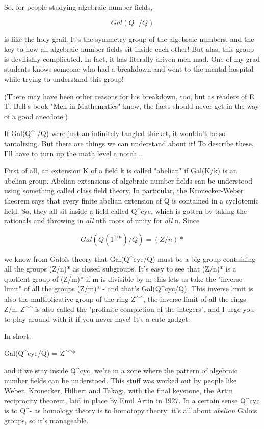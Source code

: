So, for people studying algebraic number fields,

$$
                           Gal(Q^{-}/Q)
$$
    
is like the holy grail.  It's the symmetry group of the algebraic numbers, 
and the key to how all algebraic number fields sit inside each other!
But alas, this group is devilishly complicated.  In fact, it has literally 
driven men mad.  One of my grad students knows someone who had a breakdown 
and went to the mental hospital while trying to understand this group!

(There may have been other reasons for his breakdown, too, but as readers
of E. T. Bell's book "Men in Mathematics" know, the facts should never get
in the way of a good anecdote.)  

If Gal(Q^{-}/Q) were just an infinitely tangled thicket, it wouldn't be so 
tantalizing.  But there are things we can understand about it!  To describe
these, I'll have to turn up the math level a notch...

First of all, an extension K of a field k is called "abelian" if Gal(K/k) 
is an abelian group.  Abelian extensions of algebraic number fields can be
understood using something called class field theory.  In particular, the 
Kronecker-Weber theorem says that every finite abelian extension of Q is 
contained in a cyclotomic field.  So, they all sit inside a field called
Q^{cyc}, which is gotten by taking the rationals and throwing in \emph{all} nth 
roots of unity for \emph{all} n.  Since

$$
Gal(Q(1^{1/n})/Q) = (Z/n)*
$$
    
we know from Galois theory that Gal(Q^{cyc}/Q) must be a big group containing 
all the groups (Z/n)* as closed subgroups.  It's easy to see that (Z/n)* is
a quotient group of (Z/m)* if m is divisible by n; this lets us take the 
"inverse limit" of all the groups (Z/m)* - and that's Gal(Q^{cyc}/Q).  This 
inverse limit is also the multiplicative group of the ring Z^{^}, the inverse 
limit of all the rings Z/n.  Z^{^} is also called the "profinite completion of 
the integers", and I urge you to play around with it if you never have!  
It's a cute gadget.

In short:

Gal(Q^{cyc}/Q) = Z^{^}*

and if we stay inside Q^{cyc}, we're in a zone where the pattern of algebraic
number fields can be understood.  This stuff was worked out by people like
Weber, Kronecker, Hilbert and Takagi, with the final keystone, the Artin
reciprocity theorem, laid in place by Emil Artin in 1927.  In a certain 
sense Q^{cyc} is to Q^{-} as homology theory is to homotopy theory: it's all 
about \emph{abelian} Galois groups, so it's manageable.  

